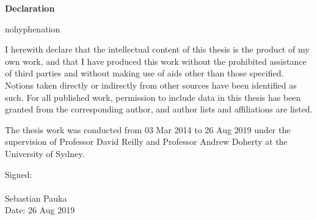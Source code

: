 {}

\bgroup
\LARGE \bf \centering Declaration \\
\egroup

\begin{center}
\begin{minipage}[c]{0.75\textwidth}
\begin{hyphenrules}{nohyphenation}
\begin{onehalfspace}
    \vspace{2em}
    I herewith declare that the intellectual content of this thesis is the product of my own work, and that I have produced this work without the prohibited assistance of third parties and without making use of aids other than those specified. Notions taken directly or indirectly from other sources have been identified as such. For all published work, permission to include data in this thesis has been granted from the corresponding author, and author lists and affiliations are listed.

    \vspace{1em}
    The thesis work was conducted from 03 Mar 2014 to 26 Aug 2019 under the supervision of Professor David Reilly and Professor Andrew Doherty at the University of Sydney.

    \vspace{5em}
    \hspace*{0mm}Signed:\vspace{2pt}\dashsign\\
    \vspace{1em} \\
    \hspace*{0mm}\phantom{Signed: }Sebastian Pauka\\
    \hspace*{0mm}\phantom{Signed: }Date: 26 Aug 2019
\end{onehalfspace}
\end{hyphenrules}
\end{minipage}
\end{center}
